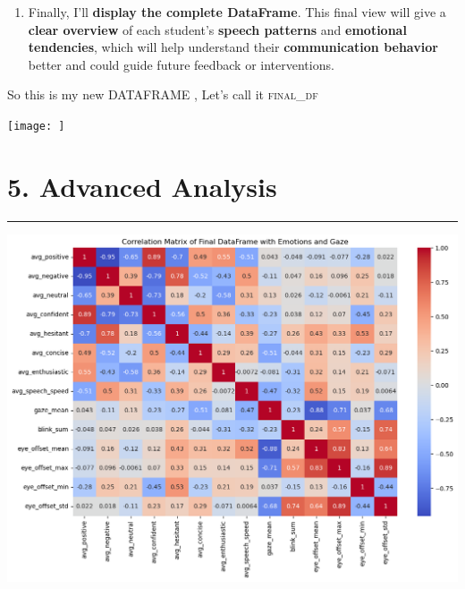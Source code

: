 \documentclass{article}
\newcommand{\highlight}[1]{\textsf{\textbf{#1}}}  %
\begin{document}
\begin{multicols}{2}
\begin{enumerate}
    \item Finally, I’ll \highlight{display the complete DataFrame}. This final view will give a \highlight{clear overview} of each student's \highlight{speech patterns} and \highlight{emotional tendencies}, which will help understand their \highlight{communication behavior} better and could guide future feedback or interventions.
\end{enumerate}

\end{multicols}
\newpage

So this is my new DATAFRAME , Let's call it \textsc{final\_df}
\begin{center}
    
\texttt{[image: ]}
\end{center}


\section{5. Advanced Analysis}
  \begin{center}
        \color{red}\rule{1\linewidth}{1mm}
    \end{center}
    
\begin{center}
    \includegraphics[width=1\columnwidth]{images/corr_matrix_of_final_data.png}
    \caption{}
    \label{fig:enter-label}
\end{center}
\end{document}
